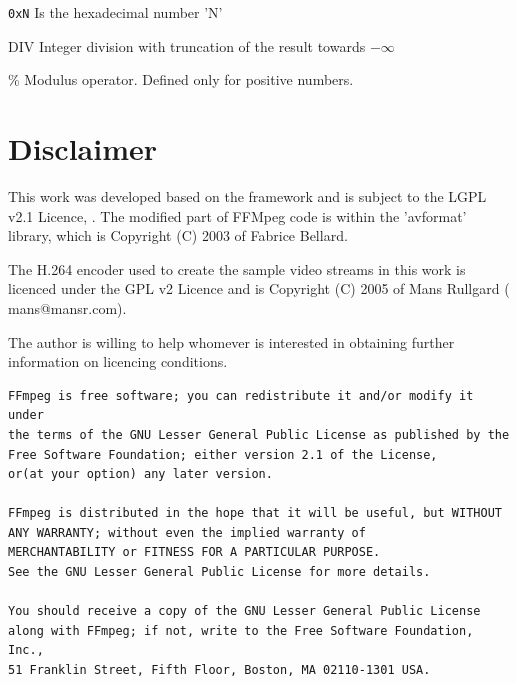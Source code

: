 \documentclass[
	12pt,				%
	openright,			%
	twoside,			%
	a4paper,			%
	brazil,
	french,				%
	english
	]{abntex2}
\begin{document}



\begin{simbolos}
  \item[\texttt{0xN}] Is the hexadecimal number 'N'
  \item[DIV] Integer division with truncation of the result towards $-\infty$
  \item[\%] Modulus operator. Defined only for positive numbers.
\end{simbolos}

\tableofcontents*
\cleardoublepage



\textual

\chapter*[Disclaimer]{Disclaimer}

This work was developed based on the \cite{ffmpeg} framework and is subject to the LGPL v2.1 Licence, \cite{gplv2}. The modified part of FFMpeg code is within the 'avformat' library, which is Copyright (C) 2003 of Fabrice Bellard. 

The H.264 encoder used to create the sample video streams in this work is licenced under the GPL v2 Licence and is Copyright (C) 2005 of Mans Rullgard ( mans@mansr.com).

The author is willing to help whomever is interested in obtaining further information on licencing conditions.

\begin{lstlisting}[]
FFmpeg is free software; you can redistribute it and/or modify it under
the terms of the GNU Lesser General Public License as published by the
Free Software Foundation; either version 2.1 of the License,
or(at your option) any later version.

FFmpeg is distributed in the hope that it will be useful, but WITHOUT
ANY WARRANTY; without even the implied warranty of
MERCHANTABILITY or FITNESS FOR A PARTICULAR PURPOSE.
See the GNU Lesser General Public License for more details.

You should receive a copy of the GNU Lesser General Public License
along with FFmpeg; if not, write to the Free Software Foundation, Inc.,
51 Franklin Street, Fifth Floor, Boston, MA 02110-1301 USA.
\end{lstlisting}
\end{document}
